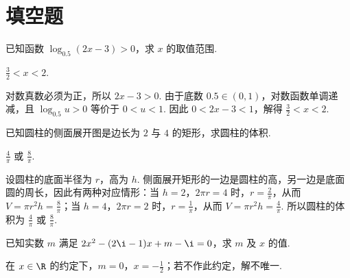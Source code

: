 \section{填空题}

\begin{problem}

已知函数 \(\log_{0.5}(2x - 3) > 0\)，求 \(x\) 的取值范围\fillinblank{}.
\end{problem}

\begin{answer}
\(\frac{3}{2}<x<2\).
\end{answer}

\begin{solution}
对数真数必须为正，所以 \(2x-3>0\). 由于底数 \(0.5\in(0,1)\)，对数函数单调递减，且 \(\log_{0.5}u>0\) 等价于 \(0<u<1\). 因此 \(0<2x-3<1\)，解得 \(\frac{3}{2}<x<2\).
\end{solution}

\begin{problem}

已知圆柱的侧面展开图是边长为 \(2\) 与 \(4\) 的矩形，求圆柱的体积\fillinblank{}.
\end{problem}

\begin{answer}
\(\frac{4}{\pi}\) 或 \(\frac{8}{\pi}\).
\end{answer}

\begin{solution}
设圆柱的底面半径为 \(r\)，高为 \(h\). 侧面展开矩形的一边是圆柱的高，另一边是底面圆的周长，因此有两种对应情形：当 \(h=2\)，\(2\pi r=4\) 时，\(r=\frac{2}{\pi}\)，从而 \(V=\pi r^{2}h=\frac{8}{\pi}\)；当 \(h=4\)，\(2\pi r=2\) 时，\(r=\frac{1}{\pi}\)，从而 \(V=\pi r^{2}h=\frac{4}{\pi}\). 所以圆柱的体积为 \(\frac{4}{\pi}\) 或 \(\frac{8}{\pi}\).
\end{solution}

\begin{problem}

已知实数 \(m\) 满足 \(2x^{2} - (2\i - 1)x + m - \i = 0\)，求 \(m\) 及 \(x\) 的值\fillinblank{}.
\end{problem}

\begin{answer}
在 \(x\in\R\) 的约定下，\(m=0\)，\(x=-\frac{1}{2}\)；若不作此约定，解不唯一.
\end{answer}

